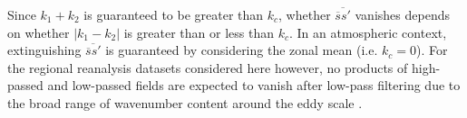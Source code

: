 Since $k_1+k_2$ is guaranteed to be greater than $k_c$, whether $\overline{\overline{s} s'}$ vanishes depends on whether $\lvert k_1-k_2 \rvert$ is greater than or less than $k_c$. In an atmospheric context, extinguishing $\overline{\overline{s} s'}$ is guaranteed by considering the zonal mean (i.e. $k_c=0$). For the regional reanalysis datasets considered here however, no products of high-passed and low-passed fields are expected to vanish after low-pass filtering due to the broad range of wavenumber content around the eddy scale \citep{scott2005direct,tulloch2011scales}.